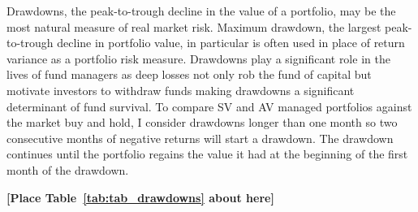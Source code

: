 Drawdowns, the peak-to-trough decline in the value of a portfolio, may be the most natural measure of real market risk. \citep{magdon-ismail_maximum_2006} Maximum drawdown, the largest peak-to-trough decline in portfolio value, in particular is often used in place of return variance as a portfolio risk measure. \citep{johansen_large_2000,articlev1,articlev2,noauthor_sornette_nodate} Drawdowns play a significant role in the lives of fund managers as deep losses not only rob the fund of capital but motivate investors to withdraw funds making drawdowns a significant determinant of fund survival. \citep{baba_hedge_nodate,papaioannou_procyclical_2013,lang_2006} To compare SV and AV managed portfolios against the market buy and hold, I consider drawdowns longer than one month so two consecutive months of negative returns will start a drawdown. The drawdown continues until the portfolio regains the value it had at the beginning of the first month of the drawdown. 

\bigskip
\centerline{\bf [Place Table~\ref{tab:tab_drawdowns} about here]}
\bigskip

